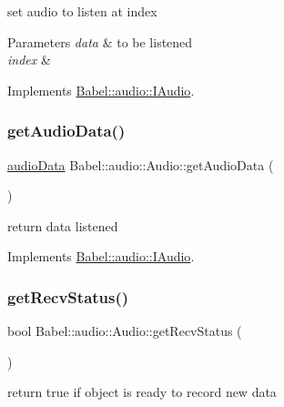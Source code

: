set audio to listen at index 
\begin{DoxyParams}{Parameters}
{\em data} & to be listened \\
\hline
{\em index} & \\
\hline
\end{DoxyParams}


Implements \hyperlink{classBabel_1_1audio_1_1IAudio_a9e36fb7ef439a3193cd104b340d7215c}{Babel\+::audio\+::\+I\+Audio}.

\mbox{\label{classBabel_1_1audio_1_1Audio_af71d8ca6c102c890c45db9af41f70a2d}} 
\subsubsection{\texorpdfstring{get\+Audio\+Data()}{getAudioData()}}
{\footnotesize\ttfamily \hyperlink{structaudioData}{audio\+Data} Babel\+::audio\+::\+Audio\+::get\+Audio\+Data (\begin{DoxyParamCaption}{ }\end{DoxyParamCaption})\hspace{0.3cm}{\ttfamily [virtual]}}

return data listened 

Implements \hyperlink{classBabel_1_1audio_1_1IAudio_ae80294d5441717125361d1fd0a65b9cf}{Babel\+::audio\+::\+I\+Audio}.

\mbox{\label{classBabel_1_1audio_1_1Audio_a9977bd57a40c49f0a03351bf1866da48}} 
\subsubsection{\texorpdfstring{get\+Recv\+Status()}{getRecvStatus()}}
{\footnotesize\ttfamily bool Babel\+::audio\+::\+Audio\+::get\+Recv\+Status (\begin{DoxyParamCaption}{ }\end{DoxyParamCaption})\hspace{0.3cm}{\ttfamily [virtual]}}

return true if object is ready to record new data 

